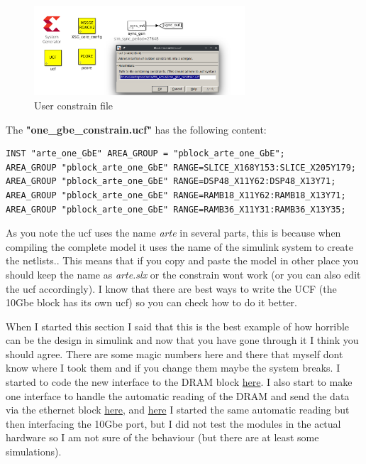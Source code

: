 \begin{enumerate}
     \begin{figure}
        \centering
        \includegraphics[width=0.7\textwidth]{images/eth_ucf.png}
        \caption{User constrain file}
        \label{fig:ucf}
    \end{figure}
    The \textbf{"one\_gbe\_constrain.ucf"} has the following content:

    \begin{lstlisting}
INST "arte_one_GbE" AREA_GROUP = "pblock_arte_one_GbE";
AREA_GROUP "pblock_arte_one_GbE" RANGE=SLICE_X168Y153:SLICE_X205Y179;
AREA_GROUP "pblock_arte_one_GbE" RANGE=DSP48_X11Y62:DSP48_X13Y71;
AREA_GROUP "pblock_arte_one_GbE" RANGE=RAMB18_X11Y62:RAMB18_X13Y71;
AREA_GROUP "pblock_arte_one_GbE" RANGE=RAMB36_X11Y31:RAMB36_X13Y35;
    \end{lstlisting}

    As you note the ucf uses the name \textit{arte} in several parts, this is because when compiling the complete model it uses the name of the simulink system to create the netlists.. This means that if you copy and paste the model in other place you should keep the name as \textit{arte.slx} or the constrain wont work (or you can also edit the ucf accordingly). I know that there are best ways to write the UCF (the 10Gbe block has its own ucf) so you can check how to do it better.


\end{enumerate}

When I started this section I said that this is the best example of how horrible can be the design in simulink and now that you have gone through it I think you should agree. There are some magic numbers here and there that myself dont know where I took them and if you change them maybe the system breaks. I started to code the new interface to the DRAM block \href{https://github.com/sebajor/verilog_codes/tree/main/casper_utils/dram_intf}{here}. I also start to make one interface to handle the automatic reading of the DRAM and send the data via the ethernet block \href{https://github.com/sebajor/verilog_codes/tree/main/casper_utils/work_in_progress/dram_one_gbe}{here}, and \href{https://github.com/sebajor/verilog_codes/tree/main/casper_utils/work_in_progress/dram_tge}{here} I started the same automatic reading but then interfacing the 10Gbe port, but I did not test the modules in the actual hardware so I am not sure of the behaviour (but there are at least some simulations).




